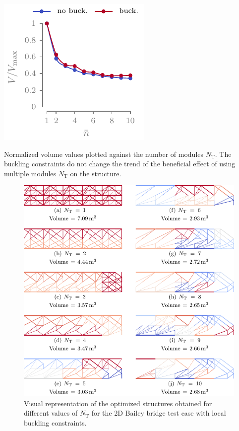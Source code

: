 \begin{marginfigure}
    \centering
    \includegraphics{figures/06_DMO/00_tug_bench_crv/vol.pdf}
    \caption{Normalized volume values plotted against the number of modules $N_\text{T}$. The buckling constraints do not change the trend of the beneficial effect of using multiple modules $N_\text{T}$ on the structure.}
    \label{fig:06_cant_volume_norm}
\end{marginfigure}

\begin{figure}
    \centering
    \includegraphics{figures/06_DMO/00_tug_bench_buck/buck.pdf}
    \caption{Visual representation of the optimized structures obtained for different values of $N_\text{T}$ for the 2D Bailey bridge test case with local buckling constraints.}
    \label{fig:06_tug_bench_buck}
\end{figure}

